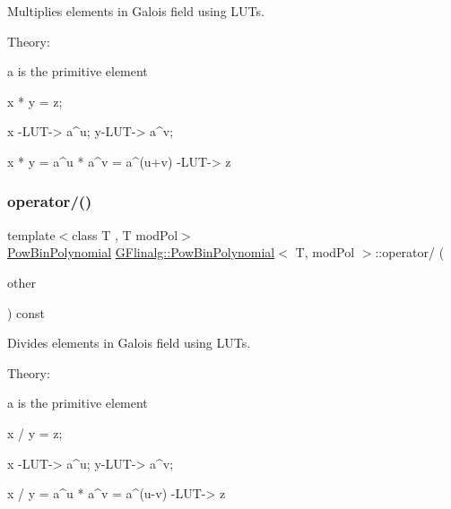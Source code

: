 Multiplies elements in Galois field using L\+U\+Ts. 

Theory\+: \begin{DoxyVerb}a is the primitive element

x * y = z;

x -LUT-> a^u; y-LUT-> a^v;

x * y = a^u * a^v = a^(u+v) -LUT-> z
\end{DoxyVerb}
 \mbox{\label{class_g_flinalg_1_1_pow_bin_polynomial_afd47f6a24660e985acf48ab216022767}} 
\subsubsection{\texorpdfstring{operator/()}{operator/()}}
{\footnotesize\ttfamily template$<$class T , T mod\+Pol$>$ \\
\mbox{\hyperlink{class_g_flinalg_1_1_pow_bin_polynomial}{Pow\+Bin\+Polynomial}} \mbox{\hyperlink{class_g_flinalg_1_1_pow_bin_polynomial}{G\+Flinalg\+::\+Pow\+Bin\+Polynomial}}$<$ T, mod\+Pol $>$\+::operator/ (\begin{DoxyParamCaption}\item[{const \mbox{\hyperlink{class_g_flinalg_1_1_pow_bin_polynomial}{Pow\+Bin\+Polynomial}}$<$ T, mod\+Pol $>$ \&}]{other }\end{DoxyParamCaption}) const\hspace{0.3cm}{\ttfamily [inline]}}



Divides elements in Galois field using L\+U\+Ts. 

Theory\+: \begin{DoxyVerb}a is the primitive element

x / y = z;

x -LUT-> a^u; y-LUT-> a^v;

x / y = a^u * a^v = a^(u-v) -LUT-> z
\end{DoxyVerb}
 \mbox{\label{class_g_flinalg_1_1_pow_bin_polynomial_a747bf5a6463be7cd89fc4320313c8563}} 
